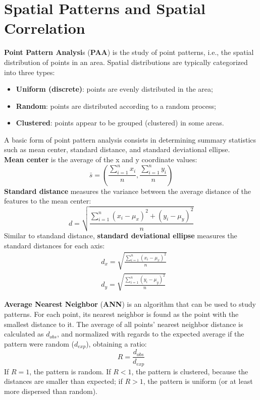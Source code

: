 \section{Spatial Patterns and Spatial Correlation}

\textbf{Point Pattern Analysi}s (\textbf{PAA}) is the study of point patterns, i.e., the spatial distribution of points in an area. Spatial distributions are typically categorized into three types:
\begin{itemize}
    \item \textbf{Uniform (discrete)}: points are evenly distributed in the area;
    \item \textbf{Random}: points are distributed according to a random process;
    \item \textbf{Clustered}: points appear to be grouped (clustered) in some areas.
\end{itemize}
A basic form of point pattern analysis consists in determining summary statistics such as mean center, standard distance, and standard deviational ellipse. \\
\textbf{Mean center} is the average of the x and y coordinate values:
\begin{equation*}
    \bar{s} = \left( \frac{\sum_{i=1}^n x_i}{n} , \frac{\sum_{i=1}^n y_i}{n} \right)
\end{equation*}
\textbf{Standard distance} measures the variance between the average distance of the features to the mean center:
\begin{equation*}
    d = \sqrt{\frac{\sum_{i=1}^n (x_i - \mu_x)^2 + (y_i - \mu_y)^2}{n}}
\end{equation*}
Similar to standand distance, \textbf{standard deviational ellipse} measures the standard distances for each axis:
\begin{align*}
    &d_x = \sqrt{\frac{\sum_{i=1}^n (x_i - \mu_x)^2}{n}} \\
    &d_y = \sqrt{\frac{\sum_{i=1}^n (y_i - \mu_y)^2}{n}}
\end{align*}

\textbf{Average Nearest Neighbor} (\textbf{ANN}) is an algorithm that can be used to study patterns. For each point, its nearest neighbor is found as the point with the smallest distance to it. The average of all points' nearest neighbor distance is calculated as $d_{obs}$, and normalized with regards to the expected average if the pattern were random ($d_{exp}$), obtaining a ratio:
\begin{equation*}
    R = \frac{d_{obs}}{d_{exp}}
\end{equation*}
If $R = 1$, the pattern is random. If $R < 1$, the pattern is clustered, because the distances are smaller than expected; if $R > 1$, the pattern is uniform (or at least more dispersed than random).

